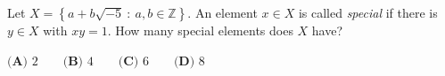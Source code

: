 Let $X=\left\{a+b\sqrt{-5}\ :\ a,b\in\mathbb Z\right\}$. An element $x\in X$ is called \emph{special} if there is $y\in X$ with $xy=1$. How many special elements does $X$ have?

$\textbf{(A) } 2\qquad\textbf{(B) } 4\qquad\textbf{(C) } 6\qquad\textbf{(D) } 8$
